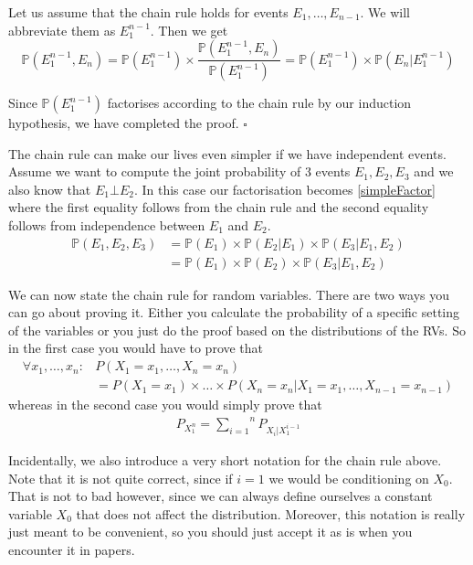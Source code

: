 Let us assume that the chain rule holds for events $ E_{1}, \ldots, E_{n-1} $. We will abbreviate them as $ E_{1}^{n-1} $. Then we get
\begin{equation}
\mathbb{P}(E_{1}^{n-1}, E_{n}) = \mathbb{P}(E_{1}^{n-1}) \times \dfrac{\mathbb{P}(E_{1}^{n-1}, E_{n})}{\mathbb{P}(E_{1}^{n-1})} 
= \mathbb{P}(E_{1}^{n-1}) \times \mathbb{P}(E_{n}|E_{1}^{n-1})
\end{equation}

Since $ \mathbb{P}(E_{1}^{n-1}) $ factorises according to the chain
rule by our induction hypothesis, we have completed the proof.
$ \square $\bigskip

The chain rule can make our lives even simpler if we have independent events. Assume we want to compute the joint probability of 3 events 
$ E_{1},E_{2},E_{3} $ and we also know that $ E_{1} \bot E_{2} $. In this case our factorisation becomes \eqref{simpleFactor} where
the first equality follows from the chain rule and the second equality follows from independence between $ E_{1} $ and $ E_{2} $.
\begin{align} \label{simpleFactor}
\mathbb{P}(E_{1}, E_{2}, E_{3}) &= \mathbb{P}(E_{1}) \times \mathbb{P}(E_{2}|E_{1}) \times \mathbb{P}(E_{3}|E_{1},E_{2}) \\
&= \mathbb{P}(E_{1}) \times \mathbb{P}(E_{2}) \times \mathbb{P}(E_{3}|E_{1},E_{2}) \nonumber
\end{align}

We can now state the chain rule for random variables. There are two ways you can go about proving it. Either you 
calculate the probability of a specific setting of the variables or you just do the proof based on the distributions of the RVs.
So in the first case you would have to prove that
\begin{align*}
\forall x_1,\ldots,x_n: &P(X_{1} = x_{1}, \ldots, X_{n} = x_{n}) \\
&= P(X_{1} = x_{1}) \times \ldots \times P(X_{n} = x_{n}|X_{1}=x_{1}, \ldots, X_{n-1} = x_{n-1})
\end{align*}
whereas in the second case you would simply prove that
\begin{align*}
P_{X_{1}^{n}} = \overset{n}{\underset{i=1}{\sum}}P_{X_{i}|X_{1}^{i-1}}
\end{align*}

Incidentally, we also introduce a very short notation for the chain rule above. Note that it is not quite correct, since if
$ i = 1 $ we would be conditioning on $ X_{0} $. That is not to bad however, since we can always define ourselves a constant variable $ X_{0} $ that does not affect the distribution. Moreover, this notation is really just meant to be convenient, so you should just accept it as is when you encounter it in papers.

